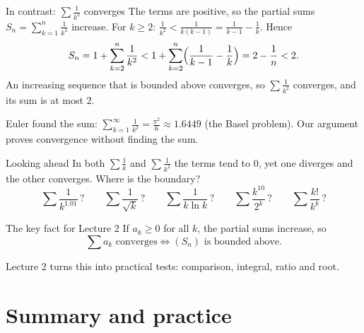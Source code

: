 \documentclass{wosm-slides}
\begin{document}
\begin{frame}{In contrast: $\sum \frac{1}{k^2}$ converges}
  The terms are positive, so the partial sums $S_n = \sum_{k=1}^{n} \frac1{k^2}$ increase.
  \pause
  For $k \ge 2$: \quad
  $\displaystyle\frac1{k^2} < \frac{1}{k(k-1)} = \frac1{k-1} - \frac1k$. \quad Hence
  \[ S_n = 1 + \sum_{k=2}^{n} \frac1{k^2}
         < 1 + \sum_{k=2}^{n} \Bigl(\frac1{k-1} - \frac1k\Bigr) = 2 - \frac1n < 2 . \]
  \pause
  An increasing sequence that is bounded above converges, so $\sum \frac1{k^2}$ converges,
  and its sum is at most $2$.
  \begin{remark}
    Euler found the sum: $\sum_{k=1}^\infty \frac1{k^2} = \frac{\pi^2}{6} \approx 1.6449$
    (the Basel problem). Our argument proves convergence without finding the sum.
  \end{remark}
\end{frame}

\begin{frame}{Looking ahead}
  In both $\sum \frac1k$ and $\sum \frac1{k^2}$ the terms tend to $0$,
  yet one diverges and the other converges. Where is the boundary?
  \[ \sum \frac{1}{k^{1.01}}\,? \qquad \sum \frac{1}{\sqrt k}\,? \qquad
     \sum \frac{1}{k \ln k}\,? \qquad \sum \frac{k^{10}}{2^k}\,? \qquad
     \sum \frac{k!}{k^k}\,? \]
  \pause
  \begin{block}{The key fact for Lecture 2}
    If $a_k \ge 0$ for all $k$, the partial sums increase, so
    \[ \sum a_k \text{ converges} \iff (S_n) \text{ is bounded above.} \]
  \end{block}
  Lecture 2 turns this into practical tests: comparison, integral, ratio and root.
\end{frame}

\section{Summary and practice}
\end{document}

